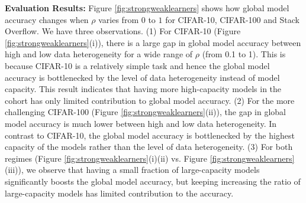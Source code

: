 \documentclass{article}
\begin{document}
%
\textbf{Evaluation Results:} Figure \ref{fig:strongweaklearners} shows how global model accuracy changes when $\rho$ varies from $0$ to $1$ for CIFAR-10,  CIFAR-100 and Stack Overflow. 
%
We have three observations.
%
(1) For CIFAR-10 (Figure \ref{fig:strongweaklearners}(i)), there is a large gap in global model accuracy between high and low data heterogeneity for a wide range of $\rho$ (from 0.1 to 1). This is because CIFAR-10 is a relatively simple task and hence the global model accuracy is bottlenecked by the level of data heterogeneity instead of model capacity. This result indicates that having more high-capacity models in the cohort has only limited contribution to global model accuracy.
%
(2) For the more challenging CIFAR-100 (Figure \ref{fig:strongweaklearners}(ii)), the gap in global model accuracy is much lower between high and low data heterogeneity. In contrast to CIFAR-10, the global model accuracy is bottlenecked by the highest capacity of the models rather than the level of data heterogeneity.
%
(3) For both regimes (Figure \ref{fig:strongweaklearners}(i)(ii) vs. Figure \ref{fig:strongweaklearners}(iii)), we observe that having a small fraction of large-capacity models significantly boosts the global model accuracy, but keeping increasing the ratio of large-capacity models has limited contribution to the accuracy.
\end{document}
